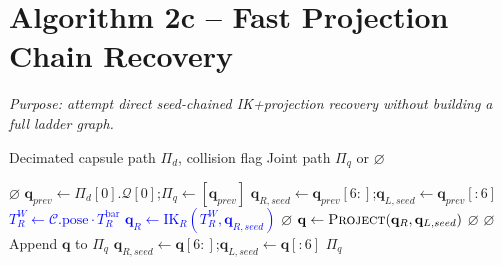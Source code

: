 \documentclass[11pt]{article}
\newcommand{\chg}[1]{\textcolor{blue}{#1}}
\newcommand{\AlgTarget}[1]{\hypertarget{#1}{}}
\begin{document}
\section*{Algorithm 2c -- Fast Projection Chain Recovery}
\noindent\textit{Purpose: attempt direct seed-chained IK+projection recovery without building a full ladder graph.}
\AlgTarget{alg:try_project_chain}
\begin{algorithm}[H]
\caption{\textsc{TryProjectChain}($\Pi_d,\,\texttt{enable\_collision}$)}
\begin{algorithmic}[1]
\Require Decimated capsule path $\Pi_d$, collision flag
\Ensure  Joint path $\Pi_q$ or $\varnothing$

  \State \Return $\varnothing$
\EndIf
\State $\mathbf{q}_{prev} \gets \Pi_d[0].\mathcal{Q}[0]$;\quad $\Pi_q \gets [\mathbf{q}_{prev}]$
\State $\mathbf{q}_{R,seed} \gets \mathbf{q}_{prev}[6:]$;\quad $\mathbf{q}_{L,seed} \gets \mathbf{q}_{prev}[:6]$
  \State \chg{$T^W_R \gets \mathcal{C}.\text{pose} \cdot T_R^{\text{bar}}$}
  \State \chg{$\mathbf{q}_R \gets \text{IK}_R(T^W_R,\mathbf{q}_{R,seed})$}
    \State \Return $\varnothing$
  \EndIf
  \State $\mathbf{q} \gets \textsc{Project}(\mathbf{q}_R,\mathbf{q}_{L,seed})$
    \State \Return $\varnothing$
  \EndIf
    \State \Return $\varnothing$
  \EndIf
  \State Append $\mathbf{q}$ to $\Pi_q$
  \State $\mathbf{q}_{R,seed}\gets \mathbf{q}[6:]$;\quad $\mathbf{q}_{L,seed}\gets \mathbf{q}[:6]$
\EndFor
\State \Return $\Pi_q$
\end{algorithmic}
\end{algorithm}

\end{document}

